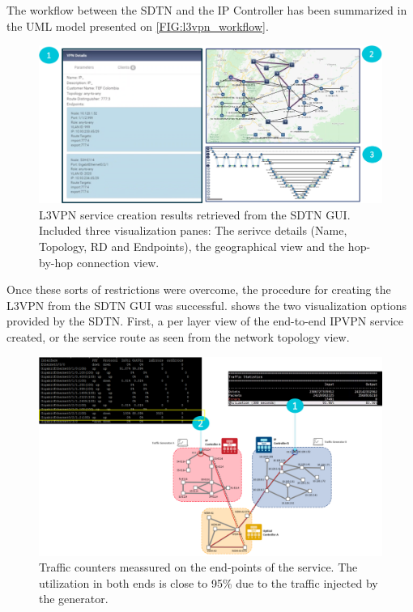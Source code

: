 \documentclass[a4paper,fleqn]{cas-dc}
\begin{document}
The workflow between the SDTN and the IP Controller has been summarized in the UML model presented on \cref{FIG:l3vpn_workflow}.

\begin{figure}
	\centering
		\includegraphics[width=\linewidth]{figs/l3vpn_results.png}
	\caption{L3VPN service creation results retrieved from the SDTN GUI. Included three visualization panes: The serivce details (Name, Topology, RD and Endpoints), the geographical view and the hop-by-hop connection view.}
	\label{FIG:l3vpn_results}
\end{figure}

Once these sorts of restrictions were overcome, the procedure for creating the L3VPN from the SDTN GUI was successful.  shows the two visualization options provided by the SDTN. First, a per layer view of the end-to-end IPVPN service created, or the service route as seen from the network topology view.

\begin{figure}
	\centering
		\includegraphics[width=\linewidth]{figs/counters.png}
	\caption{Traffic counters meassured on the end-points of the service. The utilization in both ends is close to 95\% due to the traffic injected by the generator.}
	\label{FIG:counters}
\end{figure}
\end{document}
